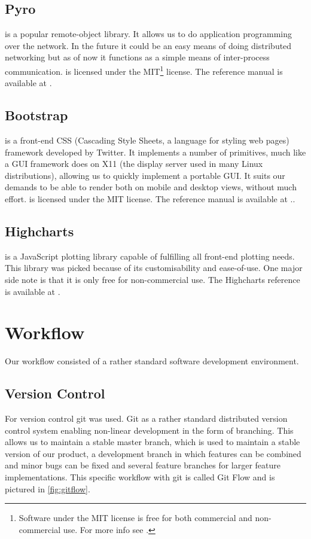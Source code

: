 \documentclass[a4paper, openany, oneside]{memoir}
\begin{document}
\subsection{Pyro}
\label{sec:pyro}
 is a popular remote-object library. It allows us to do application programming over the network. In the future it could be an easy means of doing distributed networking but as of now it functions as a simple means of inter-process communication.  is licensed under the MIT\footnote{\label{fn:mit}Software under the MIT license is free for both commercial and non-commercial use. For more info see \cite{mitlic}.} license. The reference manual is available at \cite{pyro4}.

\subsection{Bootstrap}
\label{sec:bootstrap}
 is a front-end CSS (Cascading Style Sheets, a language for styling web pages) framework developed by Twitter. It implements a number of primitives, much like a GUI framework does on X11 (the display server used in many Linux distributions), allowing us to quickly implement a portable GUI. It suits our demands to be able to render both on mobile and desktop views, without much effort.  is licensed under the MIT license. The reference manual is available at \cite{bootstrap}..

\subsection{Highcharts}
\label{sec:highcharts}
 is a JavaScript plotting library capable of fulfilling all front-end plotting needs. This library was picked because of its customisability and ease-of-use. One major side note is that it is only free for non-commercial use. The Highcharts reference is available at \cite{highcharts}.


\section{Workflow}
\label{sec:workflow}
Our workflow consisted of a rather standard software development environment.

\subsection{Version Control}
\label{sec:version-control}
For version control git was used. Git as a rather standard distributed version control system enabling non-linear development in the form of branching. This allows us to maintain a stable master branch, which is used to maintain a stable version of our product, a development branch in which features can be combined and minor bugs can be fixed and several feature branches for larger feature implementations. This specific workflow with git is called Git Flow\cite{driessen2010successful} and is pictured in \cref{fig:gitflow}.
\end{document}
